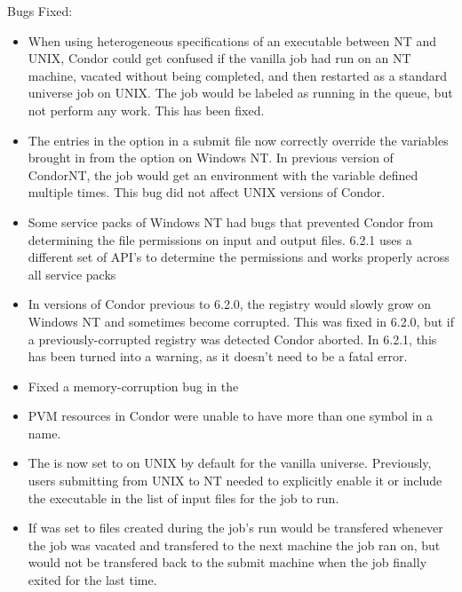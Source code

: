 \noindent Bugs Fixed:

\begin{itemize}

\item When using heterogeneous specifications of an executable between
NT and UNIX, Condor could get confused if the vanilla job had run on
an NT machine, vacated without being completed, and then restarted as
a standard universe job on UNIX. The job would be labeled as running in
the queue, but not perform any work. This has been fixed.

\item The entries in the  
option in a submit file now correctly override the variables brought in
from the  option on Windows NT.
In previous version of CondorNT, the job would get an environment with the
variable defined multiple times. This bug did not affect UNIX versions of 
Condor.

\item Some service packs of Windows NT had bugs that prevented Condor
from determining the file permissions on input and output files. 6.2.1
uses a different set of API's to determine the permissions and works 
properly across all service packs

\item In versions of Condor previous to 6.2.0, the registry would slowly
grow on Windows NT and sometimes become corrupted. This was fixed in 6.2.0,
but if a previously-corrupted registry was detected Condor aborted. In 6.2.1,
this has been turned into a warning, as it doesn't need to be a fatal error.

\item Fixed a memory-corruption bug in the 

\item PVM resources in Condor were unable to have more than one
 symbol in a name. 

\item The  is now set to 
on UNIX by default for the vanilla universe. Previously, users submitting
from UNIX to NT needed to explicitly enable it or include the executable in
the list of input files for the job to run.

\item If  was set to 
files created during the job's run would be transfered whenever the job was 
vacated and transfered to the next machine the job ran on, but would not be
transfered back to the submit machine when the job finally exited for the last time.


\end{itemize}
